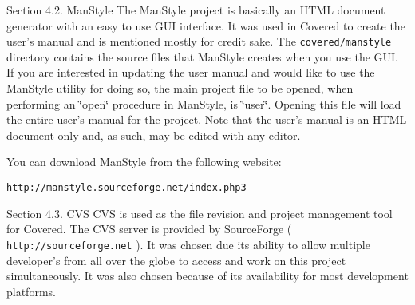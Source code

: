 \begin{Desc}
\item[Section 4.2. Man\-Style]The Man\-Style project is basically an HTML document generator with an easy to use GUI interface. It was used in Covered to create the user's manual and is mentioned mostly for credit sake. The {\tt covered/manstyle}  directory contains the source files that Man\-Style creates when you use the GUI. If you are interested in updating the user manual and would like to use the Man\-Style utility for doing so, the main project file to be opened, when performing an \char`\"{}open\char`\"{} procedure in Man\-Style, is \char`\"{}user\char`\"{}. Opening this file will load the entire user's manual for the project. Note that the user's manual is an HTML document only and, as such, may be edited with any editor.\end{Desc}
\begin{Desc}
\item[]You can download Man\-Style from the following website:\end{Desc}
\begin{Desc}
\item[]{\tt http://manstyle.sourceforge.net/index.php3}\end{Desc}




\begin{Desc}
\item[Section 4.3. CVS]CVS is used as the file revision and project management tool for Covered. The CVS server is provided by Source\-Forge ( {\tt http://sourceforge.net} ). It was chosen due its ability to allow multiple developer's from all over the globe to access and work on this project simultaneously. It was also chosen because of its availability for most development platforms.\end{Desc}




